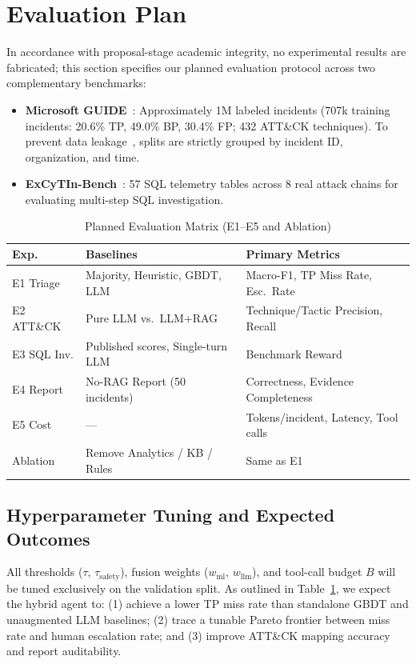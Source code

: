 \section{Evaluation Plan}

In accordance with proposal-stage academic integrity, no experimental results are fabricated; this section specifies our planned evaluation protocol across two complementary benchmarks:
\begin{itemize}
    \item \textbf{Microsoft GUIDE}~\cite{freitas2024}: Approximately 1M labeled incidents (707k training incidents: 20.6\% TP, 49.0\% BP, 30.4\% FP; 432 ATT\&CK techniques). To prevent data leakage~\cite{arp2022,engelen2021}, splits are strictly grouped by incident ID, organization, and time.
    \item \textbf{ExCyTIn-Bench}~\cite{wu2026}: 57 SQL telemetry tables across 8 real attack chains for evaluating multi-step SQL investigation.
\end{itemize}

\begin{table}[t]
\centering
\caption{Planned Evaluation Matrix (E1--E5 and Ablation)}
\label{tab:eval_plan}
\footnotesize
\begin{tabularx}{\columnwidth}{@{}l>{\RaggedRight\arraybackslash}X>{\RaggedRight\arraybackslash}X@{}}
\toprule
\textbf{Exp.} & \textbf{Baselines} & \textbf{Primary Metrics} \\
\midrule
E1 Triage & Majority, Heuristic, GBDT, LLM & Macro-F1, TP Miss Rate, Esc.\ Rate \\
E2 ATT\&CK & Pure LLM vs.\ LLM+RAG & Technique/Tactic Precision, Recall \\
E3 SQL Inv. & Published scores, Single-turn LLM & Benchmark Reward \\
E4 Report & No-RAG Report (50 incidents) & Correctness, Evidence Completeness \\
E5 Cost & --- & Tokens/incident, Latency, Tool calls \\
Ablation & Remove Analytics / KB / Rules & Same as E1 \\
\bottomrule
\end{tabularx}
\end{table}

\subsection{Hyperparameter Tuning and Expected Outcomes}
All thresholds ($\tau$, $\tau_{\text{safety}}$), fusion weights ($w_{\text{ml}}$, $w_{\text{llm}}$), and tool-call budget $B$ will be tuned exclusively on the validation split. As outlined in Table~\ref{tab:eval_plan}, we expect the hybrid agent to: (1) achieve a lower TP miss rate than standalone GBDT and unaugmented LLM baselines; (2) trace a tunable Pareto frontier between miss rate and human escalation rate; and (3) improve ATT\&CK mapping accuracy and report auditability.
